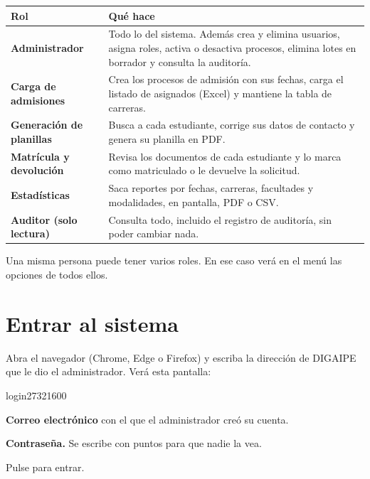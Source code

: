 \begin{tabularx}{\linewidth}{@{}>{\leavevmode\color{ulaazuloscuro}\sffamily\bfseries}p{4.2cm} X@{}}
  \toprule
  \normalfont\bfseries Rol & \bfseries Qué hace \\
  \midrule
  Administrador & Todo lo del sistema. Además crea y elimina usuarios, asigna roles, activa o
                  desactiva procesos, elimina lotes en borrador y consulta la auditoría. \\
  Carga de admisiones & Crea los procesos de admisión con sus fechas, carga el listado de
                  asignados (Excel) y mantiene la tabla de carreras. \\
  Generación de planillas & Busca a cada estudiante, corrige sus datos de contacto y genera
                  su planilla en PDF. \\
  Matrícula y devolución & Revisa los documentos de cada estudiante y lo marca como
                  matriculado o le devuelve la solicitud. \\
  Estadísticas & Saca reportes por fechas, carreras, facultades y modalidades, en pantalla,
                  PDF o CSV. \\
  Auditor (solo lectura) & Consulta todo, incluido el registro de auditoría, sin poder cambiar
                  nada. \\
  \bottomrule
\end{tabularx}

\begin{nota}
Una misma persona puede tener varios roles. En ese caso verá en el menú las opciones de todos
ellos.
\end{nota}

\section{Entrar al sistema}

Abra el navegador (Chrome, Edge o Firefox) y escriba la dirección de DIGAIPE que le dio el
administrador. Verá esta pantalla:

\begin{captura}{login}{2732}{1600}
\end{captura}

\begin{leyenda}
  \item[1] \textbf{Correo electrónico} con el que el administrador creó su cuenta.
  \item[2] \textbf{Contraseña.} Se escribe con puntos para que nadie la vea.
  \item[3] Pulse  para entrar.
\end{leyenda}


